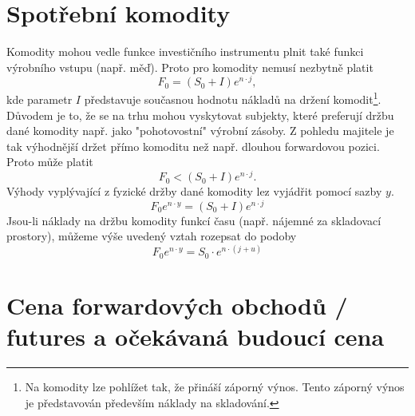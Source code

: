 \documentclass[a4paper]{book}
\begin{document}
\section{Spotřební komodity}

Komodity mohou vedle funkce investičního instrumentu plnit také funkci výrobního vstupu (např. měď). Proto pro komodity nemusí nezbytně platit
\begin{equation*}
F_0 = (S_0 + I)e^{n \cdot j},
\end{equation*}
kde parametr $I$ představuje současnou hodnotu nákladů na držení komodit\footnote{Na komodity lze pohlížet tak, že přináší záporný výnos. Tento záporný výnos je představován především náklady na skladování.}.
Důvodem je to, že se na trhu mohou vyskytovat subjekty, které preferují držbu dané komodity např. jako "pohotovostní" výrobní zásoby. Z pohledu majitele je tak výhodnější držet přímo komoditu než např. dlouhou forwardovou pozici. Proto může platit
\begin{equation*}
F_0 < (S_0 + I)e^{n \cdot j}.
\end{equation*} 
Výhody vyplývající z fyzické držby dané komodity lez vyjádřit pomocí sazby $y$.
\begin{equation*}
F_0e^{n \cdot y} = (S_0 + I)e^{n \cdot j}
\end{equation*}
Jsou-li náklady na držbu komodity funkcí času (např. nájemné za skladovací prostory), můžeme výše uvedený vztah rozepsat do podoby
\begin{equation*}
F_0e^{n \cdot y} = S_0 \cdot e^{n \cdot (j + u)}
\end{equation*}

\section{Cena forwardových obchodů / futures a očekávaná budoucí cena}
\end{document}
